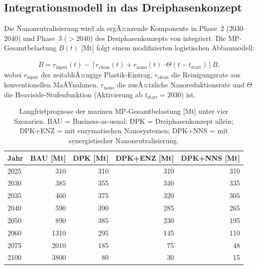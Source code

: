 ﻿\documentclass[12pt,a4paper]{article}
\theoremstyle{definition}
\theoremstyle{remark}
\begin{document}
\subsection{Integrationsmodell in das Dreiphasenkonzept}

Die Nanoneutralisierung wird als ergÃ¤nzende Komponente in Phase~2 (2030--2040)
und Phase~3 ($> 2040$) des Dreiphasenkonzepts von \cite{cleanocn_epp2026}
integriert. Die MP-Gesamtbelastung $B(t)$ [Mt] folgt einem modifizierten
logistischen Abbaumodell:

\begin{equation}
  \dot{B} = r_{\text{input}}(t) - \left[r_{\text{clean}}(t) +
             r_{\text{nano}}(t) \cdot \Theta(t - t_{\text{start}})\right] B,
  \label{eq:langzeit_ode}
\end{equation}
wobei $r_{\text{input}}$ der zeitabhÃ¤ngige Plastik-Eintrag,
$r_{\text{clean}}$ die Reinigungsrate aus konventionellen MaÃŸnahmen,
$r_{\text{nano}}$ die zusÃ¤tzliche Nanoreduktionsrate und
$\Theta$ die Heaviside-Stufenfunktion (Aktivierung ab $t_{\text{start}} = 2030$) ist.

\begin{table}[H]
\centering
\caption{Langfristprognose der marinen MP-Gesamtbelastung [Mt] unter vier Szenarien.
  BAU = Business-as-usual; DPK = Dreiphasenkonzept allein; DPK+ENZ = mit enzymatischen
  Nanosystemen; DPK+NNS = mit synergistischer Nanoneutralisierung.}
\label{tab:langzeitprognose}
\begin{tabular}{lrrrr}
\toprule
\textbf{Jahr} & \textbf{BAU [Mt]} & \textbf{DPK [Mt]} & \textbf{DPK+ENZ [Mt]} & \textbf{DPK+NNS [Mt]} \\
\midrule
2025 & 310 & 310 & 310 & 310 \\
2030 & 385 & 355 & 340 & 335 \\
2035 & 460 & 375 & 320 & 305 \\
2040 & 590 & 390 & 285 & 265 \\
2050 & 890 & 385 & 230 & 195 \\
2060 & 1310 & 295 & 145 & 110 \\
2075 & 2010 & 185 & 75  & 48  \\
2100 & 3800 & 80  & 30  & 15  \\
\bottomrule
\end{tabular}
\end{table}
\end{document}
